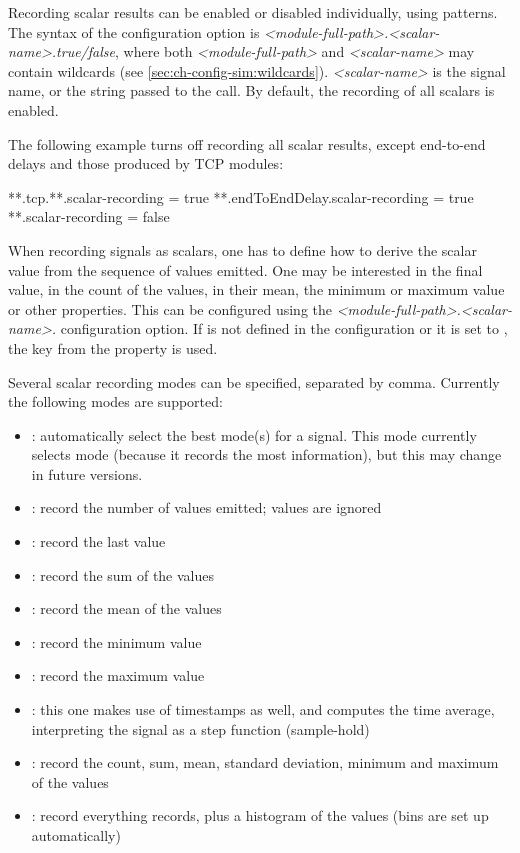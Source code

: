Recording scalar results can be enabled or disabled individually, using
patterns. The syntax of the configuration option is
\textit{<module-full-path>.<scalar-name>.}\textit{true/false},
where both \textit{<module-full-path>} and \textit{<scalar-name>}
may contain wildcards (see \ref{sec:ch-config-sim:wildcards}).
\textit{<scalar-name>} is the signal name, or the string passed to the
 call. By default, the recording of all scalars is
enabled.

The following example turns off recording all scalar results, except
end-to-end delays and those produced by TCP modules:

\begin{inifile}
**.tcp.**.scalar-recording = true
**.endToEndDelay.scalar-recording = true
**.scalar-recording = false
\end{inifile}


When recording signals as scalars, one has to define how to derive the
scalar value from the sequence of values emitted. One may be interested
in the final value, in the count of the values, in their mean, the minimum
or maximum value or other properties. This can be configured using the
\textit{<module-full-path>.<scalar-name>.}
configuration option. If  is not defined
in the configuration or it is set to , the  key
from the  property is used.

Several scalar recording modes can be specified, separated by comma.
Currently the following modes are supported:

\begin{itemize}
  \item{}: automatically select the best mode(s) for a signal. This mode
      currently selects  mode (because it records the most
      information), but this may change in future versions.
  \item{}: record the number of values emitted; values are ignored
  \item{}: record the last value
  \item{}: record the sum of the values
  \item{}: record the mean of the values
  \item{}: record the minimum value
  \item{}: record the maximum value
  \item{}: this one makes use of timestamps as well, and computes the
      time average, interpreting the signal as a step function (sample-hold)
  \item{}: record the count, sum, mean, standard deviation, minimum
      and maximum of the values
  \item{}: record everything  records, plus a histogram
      of the values (bins are set up automatically)
\end{itemize}

